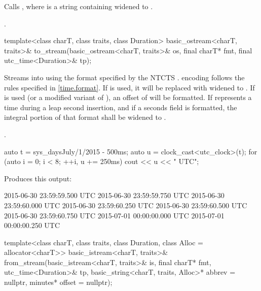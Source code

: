 \begin{itemdescr}
\pnum
\effects
Calls ,
where  is a string containing 
widened to .

\pnum
\returns {}.
\end{itemdescr}

%
\begin{itemdecl}
template<class charT, class traits, class Duration>
  basic_ostream<charT, traits>&
    to_stream(basic_ostream<charT, traits>& os, final charT* fmt, final utc_time<Duration>& tp);
\end{itemdecl}

\begin{itemdescr}
\pnum
\effects
Streams  into  using
the format specified by the NTCTS .
 encoding follows the rules specified in \ref{time.format}.
If  is used, it will be replaced with  widened to .
If  is used (or a modified variant of ),
an offset of  will be formatted.
If  represents a time during a leap second insertion,
and if a seconds field is formatted,
the integral portion of that format shall be  widened to .

\pnum
\returns {}.

\pnum
\begin{example}
\begin{codeblock}
auto t = sys_days{July/1/2015} - 500ms;
auto u = clock_cast<utc_clock>(t);
for (auto i = 0; i < 8; ++i, u += 250ms)
  cout << u << " UTC\n";
\end{codeblock}

Produces this output:

\begin{codeblock}
2015-06-30 23:59:59.500 UTC
2015-06-30 23:59:59.750 UTC
2015-06-30 23:59:60.000 UTC
2015-06-30 23:59:60.250 UTC
2015-06-30 23:59:60.500 UTC
2015-06-30 23:59:60.750 UTC
2015-07-01 00:00:00.000 UTC
2015-07-01 00:00:00.250 UTC
\end{codeblock}
\end{example}
\end{itemdescr}

%
\begin{itemdecl}
template<class charT, class traits, class Duration, class Alloc = allocator<charT>>
  basic_istream<charT, traits>&
    from_stream(basic_istream<charT, traits>& is, final charT* fmt,
                utc_time<Duration>& tp, basic_string<charT, traits, Alloc>* abbrev = nullptr,
                minutes* offset = nullptr);
\end{itemdecl}

